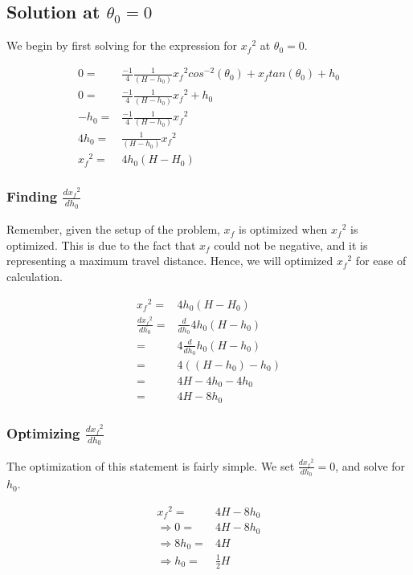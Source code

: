 \documentclass[11pt]{article}
\begin{document}
\subsection{Solution at \(\theta_0 = 0\)}
\label{sec:orgc1820e2}
We begin by first solving for the expression for \({x_f}^2\) at \(\theta_0 = 0\).

\begin{align}
    0 =& \frac{-1}{4} \frac{1}{(H-h_0)}{x_f}^2cos^{-2}(\theta_0) + x_f tan(\theta_0) + h_0 \\
    0 =& \frac{-1}{4} \frac{1}{(H-h_0)}{x_f}^2 + h_0 \\
    -h_0 =& \frac{-1}{4} \frac{1}{(H-h_0)}{x_f}^2\\
    4h_0 =& \frac{1}{(H-h_0)}{x_f}^2\\
    {x_f}^2 =& 4h_0(H-H_0)
\end{align}

\subsubsection{Finding \(\frac{d{x_f}^2}{dh_0}\)}
\label{sec:orgcdc1e06}
Remember, given the setup of the problem, \(x_f\) is optimized when \({x_f}^2\) is optimized. This is due to the fact that \(x_f\) could not be negative, and it is representing a maximum travel distance. Hence, we will optimized \({x_f}^2\) for ease of calculation.

\begin{align}
    {x_f}^2 =& 4h_0(H-H_0) \\
    \frac{d{x_f}^2}{dh_0} =& \frac{d}{dh_0} 4h_0(H-h_0) \\
    =& 4\frac{d}{dh_0} h_0(H-h_0) \\
    =& 4 ((H-h_0) - h_0)  \\
    =& 4H-4h_0 - 4h_0  \\
    =& 4H-8h_0
\end{align}

\subsubsection{Optimizing \(\frac{d{x_f}^2}{dh_0}\)}
\label{sec:org25da68e}
The optimization of this statement is fairly simple. We set \(\frac{d{x_f}^2}{dh_0}=0\), and solve for \(h_0\).

\begin{align}
    {x_f}^2 =& 4H-8h_0 \\
    \Rightarrow 0 =& 4H-8h_0 \\
    \Rightarrow 8h_0 =& 4H \\
    \Rightarrow h_0 =& \frac{1}{2}H 
\end{align}
\end{document}
